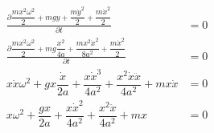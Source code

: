 \begin{align*}
    \frac{\partial \dfrac{mx^2\omega^2}{2}+mgy+\dfrac{m\dot y^2}{2}+\dfrac{m\dot x^2}{2}}{\partial t}&=0\\
    \frac{\partial \dfrac{mx^2\omega^2}{2}+mg\dfrac{x^2}{4a}+\dfrac{mx^2\dot x^2}{8a^2}+\dfrac{m\dot x^2}{2}}{\partial t}&=0\\
    x\dot x\omega^2
    +gx\dfrac{\dot x}{2a}
    +\dfrac{x\dot x^3}{4a^2}
    +\dfrac{x^2\dot x\ddot x}{4a^2}
    +mx\dot x&=0\\
    x\omega^2
    +\dfrac{gx}{2a}
    +\dfrac{x\dot x^2}{4a^2}
    +\dfrac{x^2\ddot x}{4a^2}
    +mx&=0
\end{align*}
\newpage
